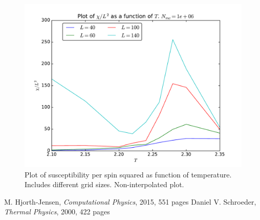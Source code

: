 \documentclass[12pt]{article}
\begin{document}
\begin{figure}[H]
\centering
\includegraphics[width=\linewidth]{Plots/Susceptibility_parallellization.pdf}
\caption{Plot of susceptibility per spin squared as function of temperature. Includes different grid sizes. Non-interpolated plot.}
\label{fig:parallell_susceptiblity}
\end{figure}

\FloatBarrier
\begin{thebibliography}{1}
     M. Hjorth-Jensen, \emph{Computational Physics}, 2015, 551 pages
     Daniel V. Schroeder, \emph{Thermal Physics}, 2000, 422 pages
\end{thebibliography}
\end{document}
